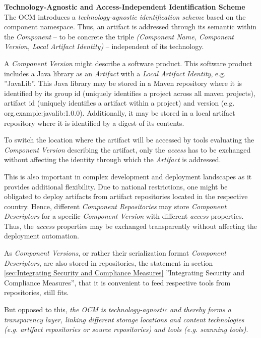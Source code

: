 \noindent\textbf{Technology-Agnostic and Access-Independent Identification Scheme}\\
The OCM introduces a \emph{technology-agnostic identification scheme} based on the component namespace. Thus, an artifact is addressed through its semantic within the \emph{Component} -- to be concrete the triple \emph{({Component Name}, {Component Version}, {Local Artifact Identity})} -- independent of its technology.\par
A \emph{Component Version} might describe a software product. This software product includes a Java library as an \emph{Artifact} with a \emph{Local Artifact Identity}, e.g. ''JavaLib''. This Java library may be stored in a Maven repository where it is identified by its group id (uniquely identifies a project across all maven projects), artifact id (uniquely identifies a artifact within a project) and version (e.g. org.example:javalib:1.0.0). Additionally, it may be stored in a local artifact repository where it is identified by a digest of its contents.\par
To switch the location where the artifact will be accessed by tools evaluating the \emph{Component Version} describing the artifact, only the \emph{access} has to be exchanged without affecting the identity through which the \emph{Artifact} is addressed.\par 
This is also important in complex development and deployment landscapes as it provides additional flexibility. Due to national restrictions, one might be obligated to deploy artifacts from artifact repositories located in the respective country. Hence, different \emph{Component Repositories} may store \emph{Component Descriptors} for a specific \emph{Component Version} with different \emph{access} properties. Thus, the \emph{access} properties may be exchanged transparently without affecting the deployment automation.\par
As \emph{Component Versions}, or rather their serialization format \emph{Component Descriptors}, are also stored in repositories, the statement in section \ref{sec:Integrating Security and Compliance Measures} ''Integrating Security and Compliance Measures'', that it is convenient to feed respective tools from repositories, still fits.\par
But opposed to this, \emph{the OCM is technology-agnostic and thereby forms a transparency layer, linking different storage locations and content technologies (e.g. artifact repositories or source repositories) and tools (e.g. scanning tools)}.\\

